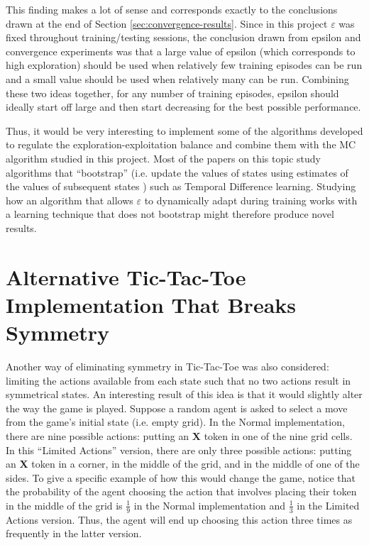 \documentclass[11pt,a4paper]{report}
\begin{document}
This finding makes a lot of sense and corresponds exactly to the conclusions drawn at the end of Section \ref{sec:convergence-results}. Since in this project $\varepsilon$ was fixed throughout training/testing sessions, the conclusion drawn from epsilon and convergence experiments was that a large value of epsilon (which corresponds to high exploration) should be used when relatively few training episodes can be run and a small value should be used when relatively many can be run. Combining these two ideas together, for any number of training episodes, epsilon should ideally start off large and then start decreasing for the best possible performance.

Thus, it would be very interesting to implement some of the algorithms developed to regulate the exploration-exploitation balance and combine them with the MC algorithm studied in this project. Most of the papers on this topic study algorithms that ``bootstrap'' (i.e. update the values of states using estimates of the values of subsequent states \cite{rl-book}) such as Temporal Difference learning. Studying how an algorithm that allows $\varepsilon$ to dynamically adapt during training works with a learning technique that does not bootstrap might therefore produce novel results.


\section{Alternative Tic-Tac-Toe Implementation That Breaks Symmetry}

Another way of eliminating symmetry in Tic-Tac-Toe was also considered: limiting the actions available from each state such that no two actions result in symmetrical states. An interesting result of this idea is that it would slightly alter the way the game is played. Suppose a random agent is asked to select a move from the game's initial state (i.e. empty grid). In the Normal implementation, there are nine possible actions: putting an \textbf{X} token in one of the nine grid cells. In this ``Limited Actions'' version, there are only three possible actions: putting an \textbf{X} token in a corner, in the middle of the grid, and in the middle of one of the sides. To give a specific example of how this would change the game, notice that the probability of the agent choosing the action that involves placing their token in the middle of the grid is $\frac{1}{9}$ in the Normal implementation and $\frac{1}{3}$ in the Limited Actions version. Thus, the agent will end up choosing this action three times as frequently in the latter version.
\end{document}
